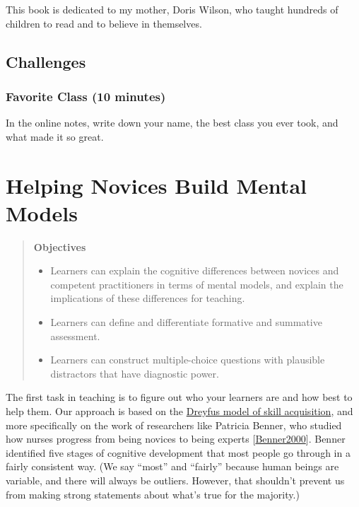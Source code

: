 \documentclass[10pt,statementpaper]{memoir}
\providecommand{\tightlist}{%
  \setlength{\itemsep}{0pt}\setlength{\parskip}{0pt}}
\begin{document}
This book is dedicated to my mother, Doris Wilson, who taught hundreds
of children to read and to believe in themselves.

\section{Challenges}\label{challenges}

\subsection{Favorite Class (10
minutes)}\label{favorite-class-10-minutes}

In the online notes, write down your name, the best class you ever took,
and what made it so great.

\chapter{Helping Novices Build Mental
Models}\label{helping-novices-build-mental-models}

\begin{quote}
\textbf{Objectives}

\begin{itemize}
\tightlist
\item
  Learners can explain the cognitive differences between novices and
  competent practitioners in terms of mental models, and explain the
  implications of these differences for teaching.
\item
  Learners can define and differentiate formative and summative
  assessment.
\item
  Learners can construct multiple-choice questions with plausible
  distractors that have diagnostic power.
\end{itemize}
\end{quote}

The first task in teaching is to figure out who your learners are and
how best to help them. Our approach is based on the
\href{https://en.wikipedia.org/wiki/Dreyfus_model_of_skill_acquisition}{Dreyfus
model of skill acquisition}, and more specifically on the work of
researchers like Patricia Benner, who studied how nurses progress from
being novices to being experts
{[}\href{biblio.html\#benner-expertise}{Benner2000}{]}. Benner
identified five stages of cognitive development that most people go
through in a fairly consistent way. (We say ``most'' and ``fairly''
because human beings are variable, and there will always be outliers.
However, that shouldn't prevent us from making strong statements about
what's true for the majority.)
\end{document}
